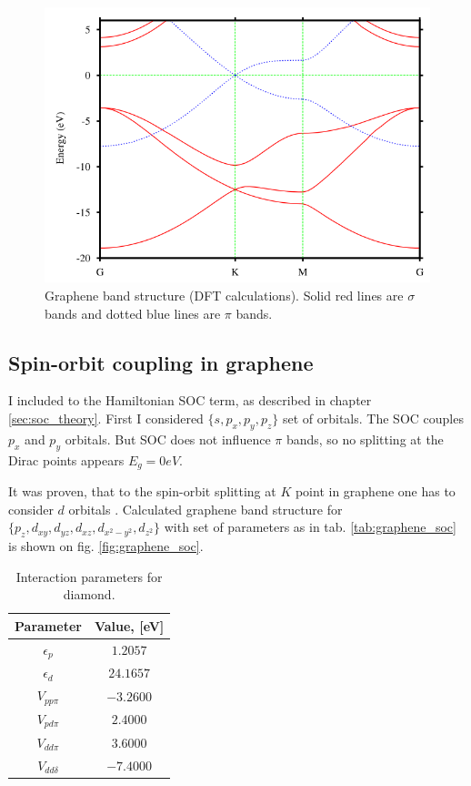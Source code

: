 \begin{figure}[h] 
\begin{center}
  \includegraphics[width=0.6\linewidth]{img/graphene_dft}
  \caption{Graphene band structure (DFT calculations). Solid red lines are $\sigma$ bands and dotted blue lines are $\pi$ bands. \cite{boukhvalov} \label{fig:graphene_dft}}
\end{center}
\end{figure}

\subsection{Spin-orbit coupling in graphene}
I included to the Hamiltonian SOC term, as described in chapter \ref{sec:soc_theory}. First I considered $\{ s, p_x, p_y, p_z \}$ set of orbitals. The SOC couples $p_x$ and $p_y$ orbitals. But SOC does not influence $\pi$ bands, so no splitting at the Dirac points appears $E_g = 0 eV$.

It was proven, that to the spin-orbit splitting at $K$ point in graphene one has to consider $d$
orbitals \cite{slonczewski}. Calculated graphene band structure for $\{p_z, d_{xy}, d_{yz}, d_{xz}, d_{x^2 - y^2}, d_{z^2} \}$ with set of parameters as in tab. \ref{tab:graphene_soc} is shown on fig. \ref{fig:graphene_soc}. 
\begin{table}[h]
 \begin{center}
  \begin{tabular}{|c|c|}
  \hline
    Parameter&Value, [eV]\\ \hline
    $\epsilon_p$ & $1.2057$ \\ \hline
    $\epsilon_d$ & $24.1657$ \\ \hline
    $V_{pp \pi}$ & $-3.2600$  \\ \hline
    $V_{pd \pi}$ & $2.4000$\\ \hline
    $V_{dd \pi}$ & $3.6000$ \\ \hline
    $V_{dd \delta}$ &  $-7.4000$\\ \hline
  \end{tabular}
 \end{center}
  \caption{Interaction parameters for diamond.}
\end{table}
